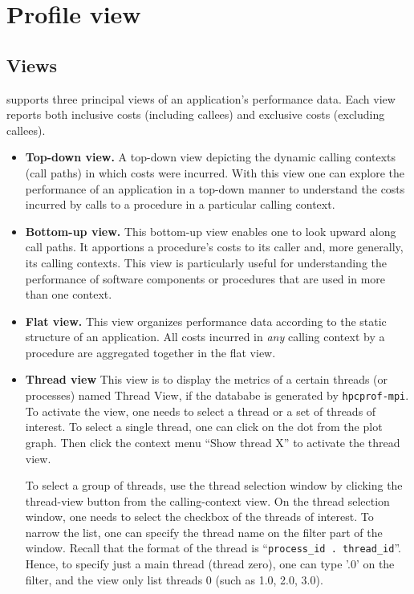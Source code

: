 \documentclass[english]{article}
\begin{document}
\section{Profile view}

\subsection{Views}

 supports three principal views of an application's performance data.
Each view reports both inclusive costs (including callees) and exclusive costs (excluding callees).

\begin{itemize}

\item \textbf{Top-down view.}
A top-down view depicting the dynamic calling contexts (call paths) in which costs were incurred.
With this view one can explore the performance of an application in a top-down manner
to understand the costs incurred by calls to a procedure in a particular calling context.

\item \textbf{Bottom-up view.}
This bottom-up view enables one to look upward along call paths.
It apportions a procedure's costs to its caller and, more generally,
its calling contexts.
This view is particularly useful for understanding the performance of software components or procedures
that are used in more than one context.

\item \textbf{Flat view.}
This view organizes performance data according to the static structure of an application.
All costs incurred in \emph{any} calling context by a procedure are aggregated together in the flat view.

\item \textbf{Thread view}
	This view is to display the metrics of a certain threads (or processes) named Thread View, if the datababe is generated by \texttt{hpcprof-mpi}.
To activate the view, one needs to select a thread or a set of threads of interest.
To select a single thread, one can click on the dot from the plot graph.
Then click the context menu ``Show thread X'' to activate the thread view.

To select a group of threads, use the thread selection window by clicking the thread-view button from the calling-context view.
On the thread selection window, one needs to select the checkbox of the threads of interest. 
To  narrow the list, one can specify the thread name on the filter part of the window.
Recall that the format of the thread is ``\texttt{process\_id . thread\_id}''.
Hence, to specify just a main thread (thread zero), one can type '.0' on the filter, and the view only list threads 0 (such as 1.0, 2.0, 3.0).


\end{itemize}
\end{document}
